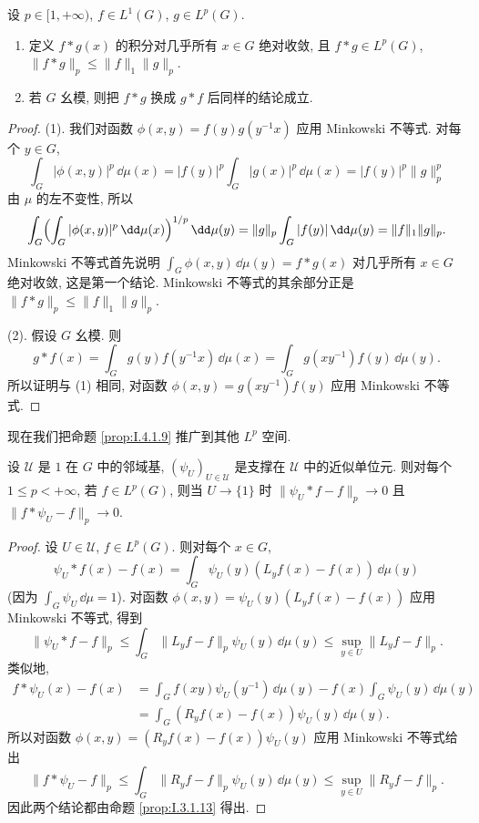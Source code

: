 \begin{corollary}[$L^1 * L^p \subset L^p$]
\label{cor:I.4.3.2}
设 $p \in [1, +\infty)$, $f \in L^1(G)$, $g \in L^p(G)$.
\begin{enumerate}
\item[(1)] 定义 $f * g(x)$ 的积分对几乎所有 $x \in G$ 绝对收敛, 且 $f * g \in L^p(G)$, $\|f * g\|_p \leq \|f\|_1\|g\|_p$.
\item[(2)] 若 $G$ 幺模, 则把 $f * g$ 换成 $g * f$ 后同样的结论成立.
\end{enumerate}
\end{corollary}

\begin{proof}
(1). 我们对函数 $\phi(x, y) = f(y)g(y^{-1}x)$ 应用 Minkowski 不等式. 对每个 $y \in G$,
\[
\int_G |\phi(x, y)|^p \,\dd\mu(x) = |f(y)|^p \int_G |g(x)|^p \,\dd\mu(x) = |f(y)|^p\|g\|_p^p
\]
由 $\mu$ 的左不变性, 所以
\[
\int_G \Bigl(\int_G |\phi(x, y)|^p \,\dd\mu(x)\Bigr)^{1/p} \,\dd\mu(y) = \|g\|_p \int_G |f(y)|\,\dd\mu(y) = \|f\|_1\|g\|_p.
\]
Minkowski 不等式首先说明 $\int_G \phi(x, y)\,\dd\mu(y) = f * g(x)$ 对几乎所有 $x \in G$ 绝对收敛, 这是第一个结论. Minkowski 不等式的其余部分正是 $\|f * g\|_p \leq \|f\|_1\|g\|_p$.

(2). 假设 $G$ 幺模. 则
\[
g * f(x) = \int_G g(y)f(y^{-1}x)\,\dd\mu(x) = \int_G g(xy^{-1})f(y)\,\dd\mu(y).
\]
所以证明与 (1) 相同, 对函数 $\phi(x, y) = g(xy^{-1})f(y)$ 应用 Minkowski 不等式.
\end{proof}

现在我们把命题 \ref{prop:I.4.1.9} 推广到其他 $L^p$ 空间.

\begin{corollary}[$L^p$ 中的近似单位元]
\label{cor:I.4.3.3}
设 $\mathcal{U}$ 是 $1$ 在 $G$ 中的邻域基, $(\psi_U)_{U \in \mathcal{U}}$ 是支撑在 $\mathcal{U}$ 中的近似单位元. 则对每个 $1 \leq p < +\infty$, 若 $f \in L^p(G)$, 则当 $U \to \{1\}$ 时 $\|\psi_U * f - f\|_p \to 0$ 且 $\|f * \psi_U - f\|_p \to 0$.
\end{corollary}

\begin{proof}
设 $U \in \mathcal{U}$, $f \in L^p(G)$. 则对每个 $x \in G$,
\[
\psi_U * f(x) - f(x) = \int_G \psi_U(y)(L_yf(x) - f(x))\,\dd\mu(y)
\]
(因为 $\int_G \psi_U\,\dd\mu = 1$). 对函数 $\phi(x, y) = \psi_U(y)(L_yf(x) - f(x))$ 应用 Minkowski 不等式, 得到
\[
\|\psi_U * f - f\|_p \leq \int_G \|L_yf - f\|_p\psi_U(y)\,\dd\mu(y) \leq \sup_{y \in U}\|L_yf - f\|_p.
\]
类似地,
\begin{align*}
f * \psi_U(x) - f(x) &= \int_G f(xy)\psi_U(y^{-1})\,\dd\mu(y) - f(x)\int_G \psi_U(y)\,\dd\mu(y) \\
&= \int_G (R_yf(x) - f(x))\psi_U(y)\,\dd\mu(y).
\end{align*}
所以对函数 $\phi(x, y) = (R_yf(x) - f(x))\psi_U(y)$ 应用 Minkowski 不等式给出
\[
\|f * \psi_U - f\|_p \leq \int_G \|R_yf - f\|_p\psi_U(y)\,\dd\mu(y) \leq \sup_{y \in U}\|R_yf - f\|_p.
\]
因此两个结论都由命题 \ref{prop:I.3.1.13} 得出.
\end{proof}

